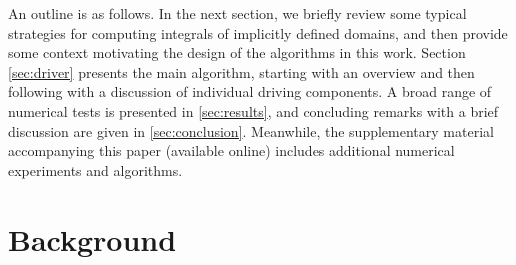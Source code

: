 \documentclass[onefignum,onetabnum,onealgnum,oneeqnum]{siamart190516}
\begin{document}
An outline is as follows. In the next section, we briefly review some typical strategies for computing integrals of implicitly defined domains, and then provide some context motivating the design of the algorithms in this work. Section \cref{sec:driver} presents the main algorithm, starting with an overview and then following with a discussion of individual driving components. A broad range of numerical tests is presented in \cref{sec:results}, and concluding remarks with a brief discussion are given in \cref{sec:conclusion}. Meanwhile, the supplementary material accompanying this paper (available online) includes additional numerical experiments and algorithms.


\section{Background}
\end{document}
